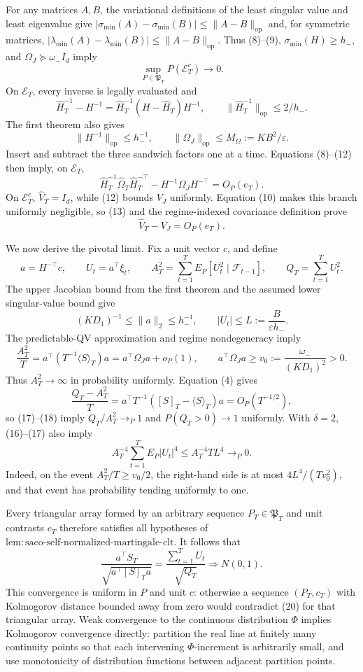 For any matrices \(A,B\), the variational definitions of the least singular value and least eigenvalue give \(|\sigma_{\min}(A)-\sigma_{\min}(B)|\le\|A-B\|_{\mathrm{op}}\) and, for symmetric matrices, \(|\lambda_{\min}(A)-\lambda_{\min}(B)|\le\|A-B\|_{\mathrm{op}}\). Thus (8)--(9), \(\sigma_{\min}(H)\ge h_-\), and \(\Omega_J\succeq\omega_-I_d\) imply
\[
 \sup_{P\in\mathfrak P_T}P(\mathcal E_T^c)\longrightarrow0. \tag{10}
\]
On \(\mathcal E_T\), every inverse is legally evaluated and
\[
 \widehat H_T^{-1}-H^{-1}
 =\widehat H_T^{-1}(H-\widehat H_T)H^{-1},
 \qquad \|\widehat H_T^{-1}\|_{\mathrm{op}}\le2/h_-. \tag{11}
\]
The first theorem also gives
\[
 \|H^{-1}\|_{\mathrm{op}}\le h_-^{-1},
 \qquad \|\Omega_J\|_{\mathrm{op}}\le M_\Omega:=KB^2/\varepsilon. \tag{12}
\]
Insert and subtract the three sandwich factors one at a time. Equations (8)--(12) then imply, on \(\mathcal E_T\),
\[
 \widehat H_T^{-1}\widehat\Omega_T\widehat H_T^{-\top}
 -H^{-1}\Omega_JH^{-\top}=O_P(e_T). \tag{13}
\]
On \(\mathcal E_T^c\), \(\widehat V_T=I_d\), while (12) bounds \(V_J\) uniformly. Equation (10) makes this branch uniformly negligible, so (13) and the regime-indexed covariance definition prove
\[
 \widehat V_T-V_J=O_P(e_T). \tag{14}
\]

We now derive the pivotal limit. Fix a unit vector \(c\), and define
\[
 a=H^{-\top}c,\qquad U_t=a^\top\xi_t,\qquad
 A_T^2=\sum_{t=1}^TE_P[U_t^2\mid\mathcal F_{t-1}],\qquad
 Q_T=\sum_{t=1}^TU_t^2. \tag{15}
\]
The upper Jacobian bound from the first theorem and the assumed lower singular-value bound give
\[
 (KD_1)^{-1}\le\|a\|_2\le h_-^{-1},
 \qquad |U_t|\le L:=\frac{B}{\varepsilon h_-}. \tag{16}
\]
The predictable-QV approximation and regime nondegeneracy imply
\[
 \frac{A_T^2}{T}
 =a^\top(T^{-1}\langle S\rangle_T)a
 =a^\top\Omega_Ja+o_P(1),
 \qquad a^\top\Omega_Ja\ge v_0:=\frac{\omega_-}{(KD_1)^2}>0. \tag{17}
\]
Thus \(A_T^2\to\infty\) in probability uniformly. Equation (4) gives
\[
 \frac{Q_T-A_T^2}{T}
 =a^\top T^{-1}([S]_T-\langle S\rangle_T)a
 =O_P(T^{-1/2}), \tag{18}
\]
so (17)--(18) imply \(Q_T/A_T^2\to_P1\) and \(P(Q_T>0)\to1\) uniformly. With \(\delta=2\), (16)--(17) also imply
\[
 A_T^{-4}\sum_{t=1}^TE_P|U_t|^4
 \le A_T^{-4}TL^4\longrightarrow_P0. \tag{19}
\]
Indeed, on the event \(A_T^2/T\ge v_0/2\), the right-hand side is at most \(4L^4/(Tv_0^2)\), and that event has probability tending uniformly to one.

Every triangular array formed by an arbitrary sequence \(P_T\in\mathfrak P_T\) and unit contrasts \(c_T\) therefore satisfies all hypotheses of \(\mathrm{lem:saco\text{-}self\text{-}normalized\text{-}martingale\text{-}clt}\). It follows that
\[
 \frac{a^\top S_T}{\sqrt{a^\top[S]_Ta}}
 =\frac{\sum_{t=1}^TU_t}{\sqrt{Q_T}}\Rightarrow N(0,1). \tag{20}
\]
This convergence is uniform in \(P\) and unit \(c\): otherwise a sequence \((P_T,c_T)\) with Kolmogorov distance bounded away from zero would contradict (20) for that triangular array. Weak convergence to the continuous distribution \(\Phi\) implies Kolmogorov convergence directly: partition the real line at finitely many continuity points so that each intervening \(\Phi\)-increment is arbitrarily small, and use monotonicity of distribution functions between adjacent partition points.

